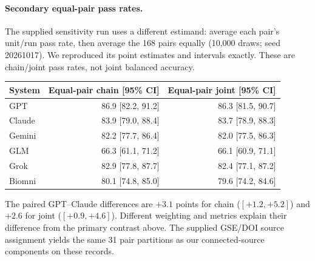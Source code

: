 \paragraph{Secondary equal-pair pass rates.} The supplied sensitivity run uses a different estimand: average each pair's unit/run pass rate, then average the 168 pairs equally (10,000 draws; seed 20261017). We reproduced its point estimates and intervals exactly. These are chain/joint pass rates, not joint balanced accuracy.
\begin{center}
\begin{tabular}{lrr}
\toprule
System & Equal-pair chain [95\% CI] & Equal-pair joint [95\% CI] \\
\midrule
GPT & 86.9 [82.2, 91.2] & 86.3 [81.5, 90.7] \\
Claude & 83.9 [79.0, 88.4] & 83.7 [78.9, 88.3] \\
Gemini & 82.2 [77.7, 86.4] & 82.0 [77.5, 86.3] \\
GLM & 66.3 [61.1, 71.2] & 66.1 [60.9, 71.1] \\
Grok & 82.9 [77.8, 87.7] & 82.4 [77.1, 87.2] \\
Biomni & 80.1 [74.8, 85.0] & 79.6 [74.2, 84.6] \\
\bottomrule
\end{tabular}
\end{center}
The paired GPT--Claude differences are $+3.1$ points for chain ($[+1.2,+5.2]$) and $+2.6$ for joint ($[+0.9,+4.6]$). Different weighting and metrics explain their difference from the primary contrast above. The supplied GSE/DOI source assignment yields the same 31 pair partitions as our connected-source components on these records.

\clearpage
